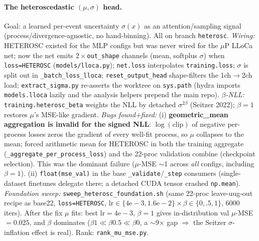 \documentclass[11pt]{article}
\newcommand{\code}[1]{\texttt{#1}}
\begin{document}
\paragraph{The heteroscedastic $(\mu,\sigma)$ head.}
Goal: a learned per-event uncertainty $\sigma(x)$ as an attention/sampling signal
(process/divergence-agnostic, no hand-binning). All on branch \code{heterosc}.
\emph{Wiring:} HETEROSC existed for the MLP configs but was never wired for the $\mu$P
LLoCa net; now the net emits $2\times$\code{out\_shape} channels (mean, softplus $\sigma$) when
\code{loss=HETEROSC} (\code{models/lloca.py}); \code{net.loss} interpolates \code{training.loss};
$\sigma$ is split out in \code{\_batch\_loss\_lloca}; \code{reset\_output\_head} shape-filters the
1ch$\to$2ch load; \code{extract\_sigma.py} re-asserts the worktree on \code{sys.path} (hydra
imports \code{models.lloca} lazily and the analysis helpers prepend the main repo).
\emph{$\beta$-NLL:} \code{training.heterosc\_beta} weights the NLL by detached
$\sigma^{2\beta}$ (Seitzer 2022); $\beta{=}1$ restores $\mu$'s MSE-like gradient.
\emph{Bugs found+fixed:} (i) \textbf{geometric\_mean aggregation is invalid for the signed NLL}:
$\log(\text{clip})$ of negative per-process losses zeros the gradient of every well-fit process, so
$\mu$ collapses to the mean; forced arithmetic mean for HETEROSC in both the training aggregate
(\code{\_aggregate\_per\_process\_loss}) and the 22-proc validation combine (checkpoint selection).
This was the dominant failure ($\mu$-MSE $\sim$1 across \emph{all} configs, including $\beta{=}1$).
(ii) \code{float(mse\_val)} in the base \code{\_validate}/\code{\_step} consumers (single-dataset
finetunes delegate there; a detached CUDA tensor crashed \code{np.mean}). \emph{Foundation
sweep:} \code{sweep\_heterosc\_foundation.sh} (same 22-proc leave-uug-out recipe as base22,
\code{loss=HETEROSC}, lr$\in\{4\mathrm{e}{-}3,1.6\mathrm{e}{-}2\}\times\beta\in\{0,.5,1\}$, 6000
iters). After the fix $\mu$ fits: best lr$=4\mathrm{e}{-}3$, $\beta{=}1$ gives in-distribution val
$\mu$-MSE $=0.025$, and $\beta$ dominates ($\beta1\!\ll\!\beta0.5\!\ll\!\beta0$, a $\sim$9$\times$
gap $\Rightarrow$ the Seitzer $\sigma$-inflation effect is real). Rank: \code{rank\_mu\_mse.py}.
\end{document}
